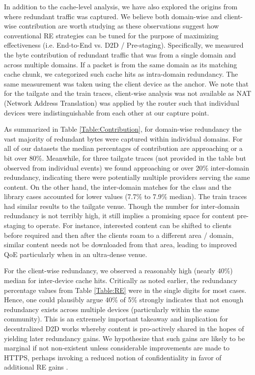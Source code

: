 \documentclass{sig-alternate}
\begin{document}
In addition to the cache-level analysis, we have also explored the origins from where redundant traffic was captured. We believe both domain-wise and client-wise contribution are worth studying as these observations suggest how conventional RE strategies can be tuned for the purpose of maximizing effectiveness (i.e. End-to-End vs. D2D / Pre-staging). Specifically, we measured the byte contribution of redundant traffic that was from a single domain and across multiple domains. If a packet is from the same domain as its matching cache chunk, we categorized such cache hits as intra-domain redundancy. The same measurement was taken using the client device as the anchor. We note that for the tailgate and the train traces, client-wise analysis was not available as NAT (Network Address Translation) was applied by the router such that individual devices were indistinguishable from each other at our capture point. 

As summarized in Table \ref{Table:Contribution}, for domain-wise redundancy the vast majority of redundant bytes were captured within individual domains. For all of our datasets the median percentages of contribution are approaching or a bit over 80\%. Meanwhile, for three tailgate traces (not provided in the table but observed from individual events) we found approaching or over 20\% inter-domain redundancy, indicating there were potentially multiple providers serving the same content. On the other hand, the inter-domain matches for the class and the library cases accounted for lower values (7.7\% to 7.9\% median). The train traces had similar results to the tailgate venue. Though the number for inter-domain redundancy is not terribly high, it still implies a promising space for content pre-staging to operate. For instance, interested content can be shifted to clients before required and then after the clients roam to a different area / domain, similar content needs not be downloaded from that area, leading to improved QoE particularly when in an ultra-dense venue.       

For the client-wise redundancy, we observed a reasonably high (nearly 40\%) median for inter-device cache hits. Critically as noted earlier, the redundancy percentage values from Table \ref{Table:RE} were in the single digits for most cases.  Hence, one could plausibly argue 40\% of 5\% strongly indicates that not enough redundancy exists across multiple devices (particularly within the same community). This is an extremely important takeaway and implication for decentralized D2D works whereby content is pro-actively shared in the hopes of yielding later redundancy gains.  We hypothesize that such gains are likely to be marginal if not non-existent unless considerable improvements are made to HTTPS, perhaps invoking a reduced notion of confidentiality in favor of additional RE gains \cite{SAABCOT:Mano}.  
\end{document}
